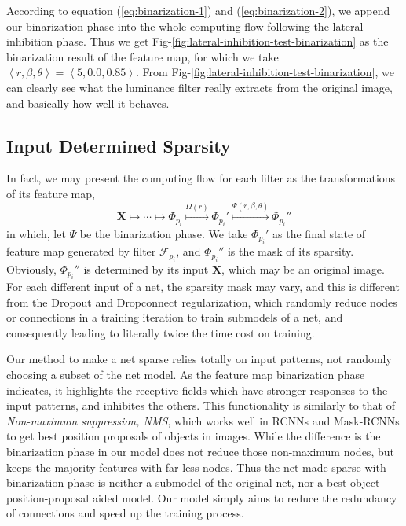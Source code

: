 \documentclass[conference]{IEEEtran}
\begin{document}
According to equation (\ref{eq:binarization-1}) and (\ref{eq:binarization-2}), we append our binarization phase
into the whole computing flow following the lateral inhibition phase. Thus we get
Fig-\ref{fig:lateral-inhibition-test-binarization}
as the binarization result of the feature map, for which we take
$\left<r,\beta,\theta\right>=\left<5,0.0,0.85\right>$.
From Fig-\ref{fig:lateral-inhibition-test-binarization},
we can clearly see what the luminance filter really extracts
from the original image, and basically how well it behaves.

\subsection{Input Determined Sparsity}
In fact, we may present the computing flow for each filter as the transformations of its feature map,
$$\mathbf{X}\longmapsto\cdots\longmapsto\Phi_{p_i}
\overset{\Omega(r)}{\longmapsto}\Phi_{p_i}'
\overset{\Psi(r,\beta,\theta)}{\longmapsto}\Phi_{p_i}''$$
in which, let $\Psi$ be the binarization phase.
We take $\Phi_{p_i}'$ as the final state of feature map generated by
filter $\mathcal{F}_{p_i}$, and $\Phi_{p_i}''$ is the mask of its sparsity.
Obviously, $\Phi_{p_i}''$ is determined by its input $\mathbf{X}$, which may be an original image.
For each different input of a net, the sparsity mask may vary,
and this is different from the Dropout\cite{hinton2012improving}
and Dropconnect\cite{wan2013regularization} regularization, which randomly
reduce nodes or connections in a training iteration to train submodels of a net,
and consequently leading to literally twice the time cost on training\cite{hinton2012improving}.

Our method to make a net sparse relies totally on input patterns, not randomly choosing a
subset of the net model. As the feature map binarization phase indicates, it highlights
the receptive fields which have stronger responses to the input patterns,
and inhibites the others. This functionality is similarly to that of
\emph{Non-maximum suppression, NMS}\cite{dalal2005histograms}, which works well
in RCNNs and Mask-RCNNs\cite{girshick2014rich} to get best position proposals of
objects in images. While the difference is the binarization phase in our model
does not reduce those non-maximum nodes, but keeps the majority features with
far less nodes. Thus the net made sparse with binarization phase is neither a submodel
of the original net, nor a best-object-position-proposal aided model. Our model simply
aims to reduce the redundancy of connections and speed up the training process.
\end{document}
